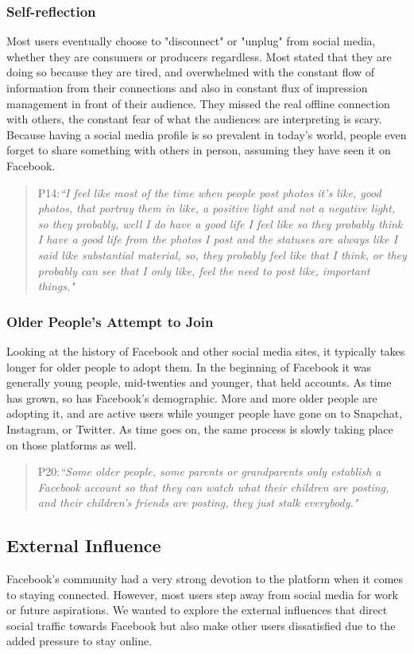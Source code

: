 \subsubsection{Self-reflection}
Most users eventually choose to "disconnect" or "unplug" from social media, whether they are consumers or producers regardless. Most stated that they are doing so because they are tired, and overwhelmed with the constant flow of information from their connections and also in constant flux of impression management in front of their audience. They missed the real offline connection with others, the constant fear of what the audiences are interpreting is scary. Because having a social media profile is so prevalent in today's world, people even forget to share something with others in person, assuming they have seen it on Facebook. 
\begin{quote}
P14:\textit{``I feel like most of the time when people post photos it's like, good photos, that portray them in like, a positive light and not a negative light, so they probably, well I do have a good life I feel like so they probably think I have a good life from the photos I post and the statuses are always like I said like substantial material, so, they probably feel like that I think, or they probably can see that I only like, feel the need to post like, important things."}
\end{quote} 
\subsubsection{Older People's Attempt to Join}
Looking at the history of Facebook and other social media sites, it typically takes longer for older people to adopt them. In the beginning of Facebook it was generally young people, mid-twenties and younger, that held accounts. As time has grown, so has Facebook's demographic. More and more older people are adopting it, and are active users while younger people have gone on to Snapchat, Instagram, or Twitter. As time goes on, the same process is slowly taking place on those platforms as well. 
\begin{quote}
P20:\textit{``Some older people, some parents or grandparents only establish a Facebook account so that they can watch what their children are posting, and their children's friends are posting, they just stalk everybody."}
\end{quote}
\subsection{External Influence}
Facebook's community had a very strong devotion to the platform when it comes to staying connected. However, most users step away from social media for work or future aspirations. We wanted to explore the external influences that direct social traffic towards Facebook but also make other users dissatisfied due to the added pressure to stay online.
